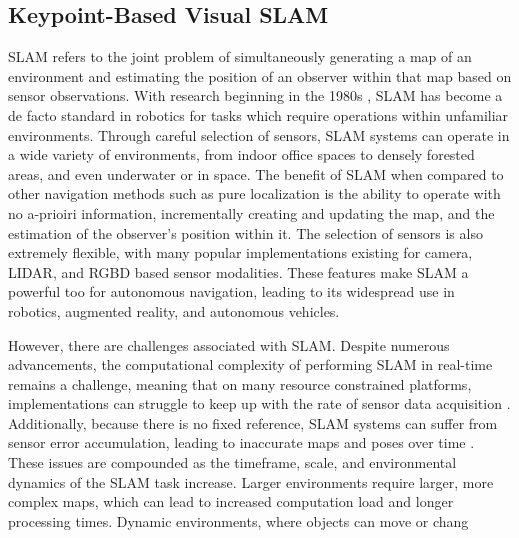 \subsection{Keypoint-Based Visual SLAM}

SLAM refers to the joint problem of simultaneously generating a map of an environment and estimating the position of an observer within that map based on sensor observations. With research beginning in the 1980s \cite{smithEstimatingUncertainSpatial1988}, SLAM has become a de facto standard in robotics for tasks which require operations within unfamiliar environments. Through careful selection of sensors, SLAM systems can operate in a wide variety of environments, from indoor office spaces to densely forested areas, and even underwater or in space. The benefit of SLAM when compared to other navigation methods such as pure localization is the ability to operate with no a-prioiri information, incrementally creating and updating the map, and the estimation of the observer's position within it. The selection of sensors is also extremely flexible, with many popular implementations existing for camera, LIDAR, and RGBD based sensor modalities. These features make SLAM a powerful too for autonomous navigation, leading to its widespread use in robotics, augmented reality, and autonomous vehicles.

However, there are challenges associated with SLAM. Despite numerous advancements, the computational complexity of performing SLAM in real-time remains a challenge, meaning that on many resource constrained platforms, implementations can struggle to keep up with the rate of sensor data acquisition \cite{semenovaQuantitativeAnalysisSystem2022}. Additionally, because there is no fixed reference, SLAM systems can suffer from sensor error accumulation, leading to inaccurate maps and poses over time \cite{cadenaPresentFutureSimultaneous2016}. These issues are compounded as the timeframe, scale, and environmental dynamics of the SLAM task increase. Larger environments require larger, more complex maps, which can lead to increased computation load and longer processing times. Dynamic environments, where objects can move or chang

